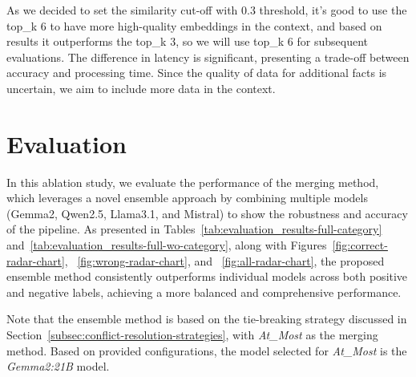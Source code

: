 As we decided to set the similarity cut-off with 0.3 threshold, it's good to use the top\_k 6 to have more high-quality embeddings in the context, and based on results it outperforms the top\_k 3, so we will use top\_k 6 for subsequent evaluations.
The difference in latency is significant, presenting a trade-off between accuracy and processing time.
Since the quality of data for additional facts is uncertain, we aim to include more data in the context.

\section{Evaluation}\label{sec:evaluation-and-discussion}
In this ablation study, we evaluate the performance of the merging method, which leverages a novel ensemble approach by combining multiple models (Gemma2, Qwen2.5, Llama3.1, and Mistral) to show the robustness and accuracy of the pipeline.
As presented in Tables~\ref{tab:evaluation_results-full-category} and~\ref{tab:evaluation_results-full-wo-category}, along with Figures~\ref{fig:correct-radar-chart}, ~\ref{fig:wrong-radar-chart}, and ~\ref{fig:all-radar-chart}, the proposed ensemble method consistently outperforms individual models across both positive and negative labels, achieving a more balanced and comprehensive performance.

Note that the ensemble method is based on the tie-breaking strategy discussed in Section~\ref{subsec:conflict-resolution-strategies}, with \textit{At\_Most} as the merging method.
Based on provided configurations, the model selected for \textit{At\_Most} is the \textit{Gemma2:21B} model.

